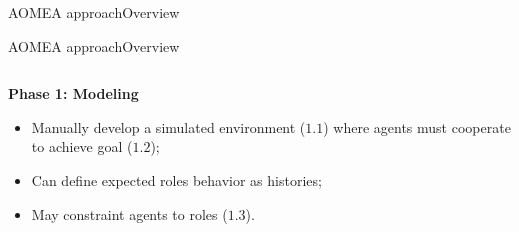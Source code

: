 \begin{frame}{AOMEA approach}{Overview}
\begin{figure}[h!]
\begin{minipage}{0.5\textwidth}
        \end{minipage}\hfill
        \label{fig:design_approach}
    \end{figure}


\end{frame}


\begin{frame}{AOMEA approach}{Overview}

    \begin{columns}

        \begin{column}{0.6\textwidth}

            \textbf{Phase 1: Modeling}

            \begin{itemize}
                \item Manually develop a simulated environment ($1.1$) where agents must cooperate to achieve goal ($1.2$);
                \item Can define expected roles behavior as histories;
                \item May constraint agents to roles ($1.3$).
            \end{itemize}

        \end{column}


\end{columns}
\end{frame}
